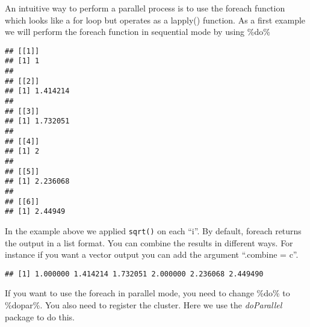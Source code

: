 \documentclass[]{article}
\newenvironment{Shaded}{\begin{snugshade}}{\end{snugshade}}
\newcommand{\KeywordTok}[1]{\textcolor[rgb]{0.13,0.29,0.53}{\textbf{#1}}}
\newcommand{\DataTypeTok}[1]{\textcolor[rgb]{0.13,0.29,0.53}{#1}}
\newcommand{\DecValTok}[1]{\textcolor[rgb]{0.00,0.00,0.81}{#1}}
\newcommand{\StringTok}[1]{\textcolor[rgb]{0.31,0.60,0.02}{#1}}
\newcommand{\OperatorTok}[1]{\textcolor[rgb]{0.81,0.36,0.00}{\textbf{#1}}}
\newcommand{\NormalTok}[1]{#1}
\begin{document}
An intuitive way to perform a parallel process is to use the foreach
function which looks like a for loop but operates as a lapply()
function. As a first example we will perform the foreach function in
sequential mode by using \%do\%

\begin{Shaded}
\end{Shaded}

\begin{verbatim}
## [[1]]
## [1] 1
## 
## [[2]]
## [1] 1.414214
## 
## [[3]]
## [1] 1.732051
## 
## [[4]]
## [1] 2
## 
## [[5]]
## [1] 2.236068
## 
## [[6]]
## [1] 2.44949
\end{verbatim}

In the example above we applied \texttt{sqrt()} on each ``i''. By
default, foreach returns the output in a list format. You can combine
the results in different ways. For instance if you want a vector output
you can add the argument ``.combine = c''.

\begin{Shaded}
\end{Shaded}

\begin{verbatim}
## [1] 1.000000 1.414214 1.732051 2.000000 2.236068 2.449490
\end{verbatim}

If you want to use the foreach in parallel mode, you need to change
\%do\% to \%dopar\%. You also need to register the cluster. Here we use
the \emph{doParallel} package to do this.

\begin{Shaded}
\end{Shaded}
\end{document}
